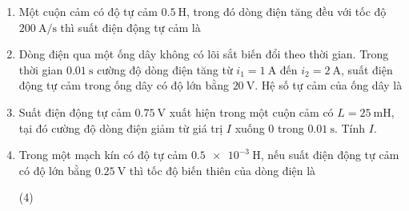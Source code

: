 \begin{enumerate}
{		
	}
	\item
	{
		Một cuộn cảm có độ tự cảm $\SI{0.5}{\henry}$, trong đó dòng điện tăng đều với tốc độ $\SI{200}{\ampere / \second}$ thì suất điện động tự cảm là
	}
		\item
	{
		Dòng điện qua một ống dây không có lõi sắt biến đổi theo thời gian. Trong thời gian $\SI{0.01}{\second}$ cường độ dòng điện tăng từ $i_1=\SI{1}{\ampere}$ đến $i_2=\SI{2}{\ampere}$, suất điện động tự cảm trong ống dây có độ lớn bằng $\SI{20}{\volt}$. Hệ số tự cảm của ống dây là
	}
		\item
	{
		Suất điện động tự cảm $\SI{0.75}{\volt}$ xuất hiện trong một cuộn cảm có $L=\SI{25}{\milli \henry}$, tại đó cường độ dòng điện giảm từ giá trị $I$ xuống $0$ trong $\SI{0.01}{\second}$. Tính $I$.
	}
			\item
	{
		Trong một mạch kín có độ tự cảm $\SI{0.5e-3}{\henry}$, nếu suất điện động tự cảm có độ lớn bằng $\SI{0.25}{\volt}$ thì tốc độ biến thiên của dòng điện là
		\begin{mcq}(4)

\end{mcq}}
\end{enumerate}
